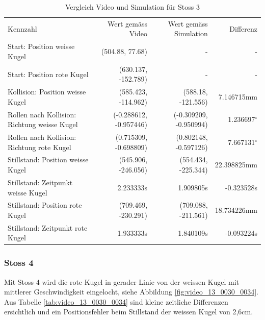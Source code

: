 \begin{table}[ht]
    \begin{tabular}{ lrrr }
        \rowcolor{\seccolor!50}
        Kennzahl & Wert gemäss Video & Wert gemäss Simulation & Differenz \\
        Start: Position weisse Kugel & (504.88, 77.68) & - & -\\
        Start: Position rote Kugel & (630.137, -152.789) & - & -\\
        Kollision: Position weisse Kugel & (585.423, -114.962) & (588.18, -121.556) & 7.146715mm\\
        Rollen nach Kollision: Richtung weisse Kugel & (-0.288612, -0.957446) & (-0.309209, -0.950994) & 1.236697$^{\circ}$ \\
        Rollen nach Kollision: Richtung rote Kugel & (0.715309, -0.698809) & (0.802148, -0.597126) & 7.667131$^{\circ}$ \\
        Stillstand: Position weisse Kugel & (545.906, -246.056) & (554.434, -225.344) & 22.398825mm\\
        Stillstand: Zeitpunkt weisse Kugel & 2.233333s & 1.909805s & -0.323528s\\
        Stillstand: Position rote Kugel & (709.469, -230.291) & (709.088, -211.561) & 18.734226mm\\
        Stillstand: Zeitpunkt rote Kugel & 1.933333s & 1.840109s & -0.093224s\\
    \end{tabular}
    \caption{Vergleich Video und Simulation für Stoss 3}
    \label{tab:video_12_0205_0208}
\end{table}

\subsubsection{Stoss 4}
Mit Stoss 4 wird die rote Kugel in gerader Linie von der weissen Kugel mit mittlerer Geschwindigkeit eingelocht,
siehe Abbildung \ref{fig:video_13_0030_0034}.
Aus Tabelle \ref{tab:video_13_0030_0034} sind kleine zeitliche Differenzen ersichtlich und
ein Positionsfehler beim Stillstand der weissen Kugel von 2,6cm.


